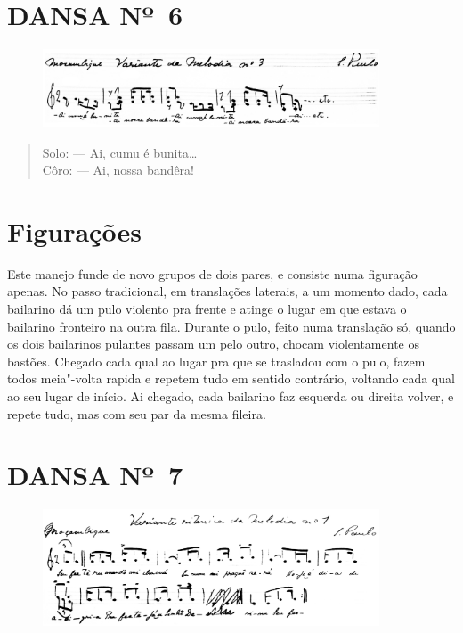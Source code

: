 \pagebreak

\section{DANSA Nº~6}

\begin{figure}[!ht]
\centering
 \includegraphics[width=100mm]{./imgs/img8.png}
\end{figure}

\begin{verse}
Solo: --- Ai, cumu é bunita\ldots{}\\
Côro: --- Ai, nossa bandêra!
\end{verse}

\section{Figurações}

Este manejo funde de novo grupos de dois pares, e consiste numa
figuração apenas. No passo tradicional, em translações laterais, a um
momento dado, cada bailarino dá um pulo violento pra frente e atinge o
lugar em que estava o bailarino fronteiro na outra fila. Durante o pulo,
feito numa translação só, quando os dois bailarinos pulantes passam um
pelo outro, chocam violentamente os bastões. Chegado cada qual ao lugar
pra que se trasladou com o pulo, fazem todos meia"-volta rapida e repetem
tudo em sentido contrário, voltando cada qual ao seu lugar de início. Ai
chegado, cada bailarino faz esquerda ou direita volver, e repete tudo,
mas com seu par da mesma fileira.

\pagebreak

\section{DANSA Nº~7}


\begin{figure}[!ht]
\centering
 \includegraphics[width=100mm]{./imgs/img9.png}
\end{figure}

